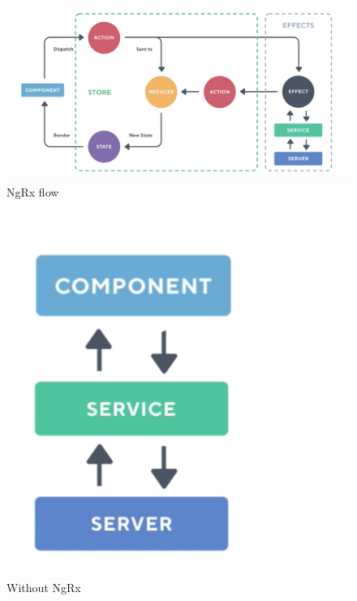 \paragraph{}
\begin{figure}[h!]
    \caption{NgRx flow}
    \includegraphics[scale=0.3]{img/cap2/ngrx}
\end{figure}
\paragraph{}

\begin{figure}[h!]
    \caption{Without NgRx}
    \includegraphics[scale=0.5]{img/cap2/without-ngrx}
\end{figure}
\paragraph{}

